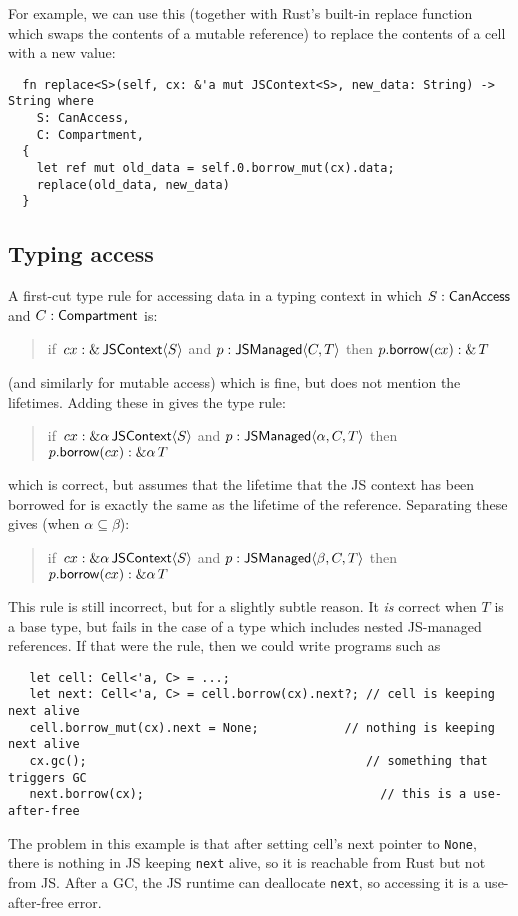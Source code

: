 For example, we can use this (together with Rust's built-in replace function
which swaps the contents of a mutable reference) to replace the contents of a cell
with a new value:
\begin{verbatim}
  fn replace<S>(self, cx: &'a mut JSContext<S>, new_data: String) -> String where
    S: CanAccess,
    C: Compartment,
  {
    let ref mut old_data = self.0.borrow_mut(cx).data;
    replace(old_data, new_data)
  }
\end{verbatim}

\subsection{Typing access}
\label{sec:typing-access}

A first-cut type rule for accessing data in a typing context
in which $S: \mathsf{CanAccess}$ and $C: \mathsf{Compartment}$ is:
\begin{quote}
  if~$cx: \&\, \mathsf{JSContext}\langle S\rangle$ and $p: \mathsf{JSManaged}\langle C,T\rangle$
  then $p.\mathsf{borrow}(cx): \&\, T$
\end{quote}
(and similarly for mutable access)
which is fine, but does not mention the lifetimes. Adding these in gives
the type rule:
\begin{quote}
  if~$cx: \&\alpha\, \mathsf{JSContext}\langle S\rangle$ and $p: \mathsf{JSManaged}\langle \alpha,C,T\rangle$
  then $p.\mathsf{borrow}(cx): \&\alpha\, T$
\end{quote}
which is correct, but assumes that the lifetime that the JS context
has been borrowed for is exactly the same as the lifetime of the
reference. Separating these gives (when $\alpha \subseteq \beta$):
\begin{quote}
  if~$cx: \&\alpha\, \mathsf{JSContext}\langle S\rangle$ and $p: \mathsf{JSManaged}\langle \beta,C,T\rangle$
  then $p.\mathsf{borrow}(cx): \&\alpha\, T$
\end{quote}
This rule is still incorrect, but for a slightly subtle reason.
It \emph{is} correct when $T$ is a base type, but fails in the case of
a type which includes nested JS-managed references. If that were the
rule, then we could write programs such as
\begin{verbatim}
   let cell: Cell<'a, C> = ...;
   let next: Cell<'a, C> = cell.borrow(cx).next?; // cell is keeping next alive
   cell.borrow_mut(cx).next = None;            // nothing is keeping next alive
   cx.gc();                                       // something that triggers GC
   next.borrow(cx);                                 // this is a use-after-free
\end{verbatim}
The problem in this example is that after setting cell's next pointer to \verb|None|,
there is nothing in JS keeping \verb|next| alive, so it is reachable
from Rust but not from JS. After a GC, the JS runtime can deallocate
\verb|next|, so accessing it is a use-after-free error.


